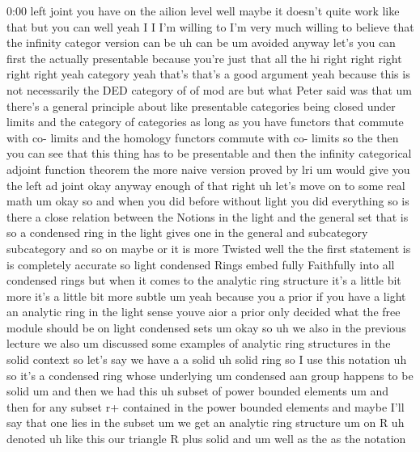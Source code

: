 \begin{unfinished}{0:00}
left  joint  you  have  on  the  ailion  level
well  maybe  it  doesn't  quite  work  like
that  but  you  can  well  yeah  I  I  I'm
willing  to  I'm  very  much  willing  to
believe  that  the  infinity  categor
version  can
be  uh  can  be  um  avoided  anyway
let's  you  can  first  the  actually
presentable  because  you're  just  that  all
the
hi  right  right  right  right  right  yeah
category  yeah  that's  that's  a  good
argument  yeah  because  this  is  not
necessarily  the  DED  category  of  of  mod
are  but  what  Peter  said  was  that  um
there's  a  general  principle  about  like
presentable  categories  being  closed
under  limits  and  the  category  of
categories  as  long  as  you  have  functors
that  commute  with  co-  limits  and  the
homology  functors  commute  with  co-
limits  so  the  then  you  can  see  that  this
thing  has  to  be  presentable  and  then  the
infinity  categorical  adjoint  function
theorem  the  more  naive  version  proved  by
lri  um  would  give  you  the  left  ad  joint
okay  anyway  enough  of  that  right  uh
let's  move  on  to  some  real  math  um
okay
so  and  when  you  did  before  without  light
you  did  everything  so  is  there  a  close
relation  between  the  Notions  in  the
light  and  the  general  set  that  is  so  a
condensed  ring  in  the  light  gives  one  in
the  general  and  subcategory  subcategory
and  so  on  maybe  or  it  is  more  Twisted
well  the  the  first  statement  is  is
completely  accurate  so  light  condensed
Rings  embed  fully  Faithfully  into  all
condensed  rings  but  when  it  comes  to  the
analytic  ring  structure  it's  a  little
bit  more  it's  a  little  bit  more
subtle
um  yeah  because  you  a  prior  if  you  have
a  light  an  analytic  ring  in  the  light
sense  youve  aior  a  prior  only  decided
what  the  free  module  should  be  on  light
condensed  sets
um  okay  so  uh  we  also  in  the  previous
lecture  we  also  um  discussed  some
examples  of  analytic  ring  structures  in
the  solid  context  so  let's  say  we  have  a
a  solid  uh  solid  ring  so  I  use  this
notation
uh  so  it's  a  condensed  ring  whose
underlying  um  condensed  aan  group
happens  to  be  solid  um  and  then  we  had
this  uh  subset  of  power  bounded
elements  um  and  then  for
any  subset  r+  contained  in  the  power
bounded  elements  and  maybe  I'll  say  that
one  lies  in  the  subset  um  we  get  an
analytic  ring
structure
um  on
R  uh
denoted
uh  like  this  our  triangle  R  plus  solid
and  um  well  as  the  as  the  notation

\end{unfinished}
